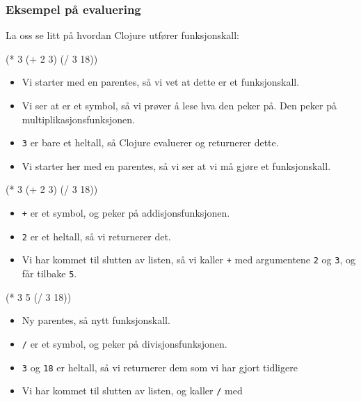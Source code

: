 \documentclass{beamer}
\begin{document}
\begin{frame}[fragile, t]
  \frametitle{Eksempel på evaluering}
  La oss se litt på hvordan Clojure utfører funksjonskall:
  \begin{overprint}
    \begin{semiverbatim}
      \alert<2>{(\alert<3>{*} \alert<4>{3} \alert<5>{(+ 2 3)} (/ 3 18))}
    \end{semiverbatim}
    \begin{itemize}
    \item<2-> Vi starter med en parentes, så vi vet at dette er et
      funksjonskall.
    \item<3-> Vi ser at {\tt *} er et symbol, så vi prøver å lese hva den peker
      på. Den peker på multiplikasjonsfunksjonen.
    \item<4-> {\tt 3} er bare et heltall, så Clojure evaluerer og returnerer
      dette.
    \item<5-> Vi starter her med en parentes, så vi ser at vi må gjøre et
      funksjonskall.
    \end{itemize}
    \begin{semiverbatim}
      (* 3 (\alert<6>{+} \alert<7>{2} \alert<8>{3}\alert<9>{)} (/ 3 18))
    \end{semiverbatim}
    \begin{itemize}
    \item<6-> {\tt +} er et symbol, og peker på addisjonsfunksjonen.
    \item<7-> {\tt 2} er et heltall, så vi returnerer det. 
    \item<9-> Vi har kommet til slutten av listen, så vi kaller {\tt +} med
      argumentene {\tt 2} og {\tt 3}, og får tilbake {\tt 5}.
    \end{itemize}
    \begin{semiverbatim}
      (* 3 \alert<10>{5} \alert<11>{(\alert<12>{/} \alert<13>{3 18}\alert<14>{)}})
    \end{semiverbatim}
    \begin{itemize}
    \item<11-> Ny parentes, så nytt funksjonskall.
    \item<12-> {\tt /} er et symbol, og peker på divisjonsfunksjonen.
    \item<13-> {\tt 3} og {\tt 18} er heltall, så vi returnerer dem som vi har
      gjort tidligere
    \item<14-> Vi har kommet til slutten av listen, og kaller {\tt /} med

\end{itemize}
\end{overprint}
\end{frame}
\end{document}
